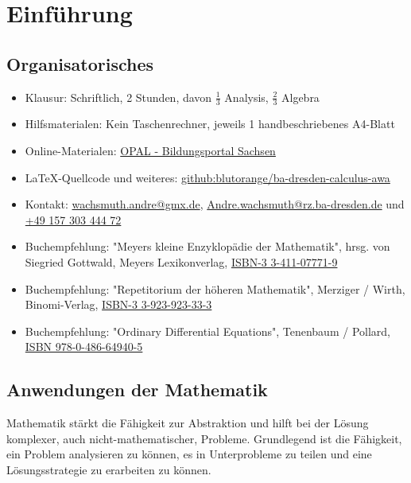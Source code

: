 \chapter{Einführung}

\section{Organisatorisches}

\begin{itemize}
	\item Klausur: Schriftlich, 2 Stunden, davon $\frac{1}{3}$ Analysis, $\frac{2}{3}$ Algebra
	\item Hilfsmaterialen: Kein Taschenrechner, jeweils 1 handbeschriebenes A4-Blatt
	\item Online-Materialen: \href{https://bildungsportal.sachsen.de/opal/auth/RepositoryEntry/11806736384?8}{OPAL - Bildungsportal Sachsen}
	\item \LaTeX-Quellcode und weiteres: \href{https://github.com/blutorange/ba-dresden-calculus-awa}{github:blutorange/ba-dresden-calculus-awa}
	\item Kontakt: \href{mailto:wachsmuth.andre@gmx.de?subject=BA/Analysis 2020: }{wachsmuth.andre@gmx.de}, \href{mailto:Andre.wachsmuth@rz.ba-dresden.de}{Andre.wachsmuth@rz.ba-dresden.de} und \href{tel:4915730344472}{+49 157 303 444 72}
	\item Buchempfehlung: "Meyers kleine Enzyklopädie der Mathematik", hrsg. von Siegried Gottwald, Meyers Lexikonverlag, \href{https://www.amazon.de/-/en/Siegfried-Gottwald/dp/3411077719}{ISBN-3 3-411-07771-9}
	\item Buchempfehlung: "Repetitorium der höheren Mathematik", Merziger / Wirth, Binomi-Verlag, \href{https://www.amazon.de/-/en/Gerhard-Merziger/dp/3923923333}{ISBN-3 3-923-923-33-3}
    \item Buchempfehlung: "Ordinary Differential Equations", Tenenbaum / Pollard, \href{https://www.lehmanns.de/shop/mathematik-informatik/1860759-9780486649405-ordinary-differential-equations}{ISBN 978-0-486-64940-5}
\end{itemize}

\section{Anwendungen der Mathematik}

Mathematik stärkt die Fähigkeit zur Abstraktion und hilft bei der Lösung komplexer, auch nicht-mathematischer, Probleme. Grundlegend
ist die Fähigkeit, ein Problem analysieren zu können, es in Unterprobleme zu teilen und eine Lösungsstrategie zu erarbeiten zu können.

